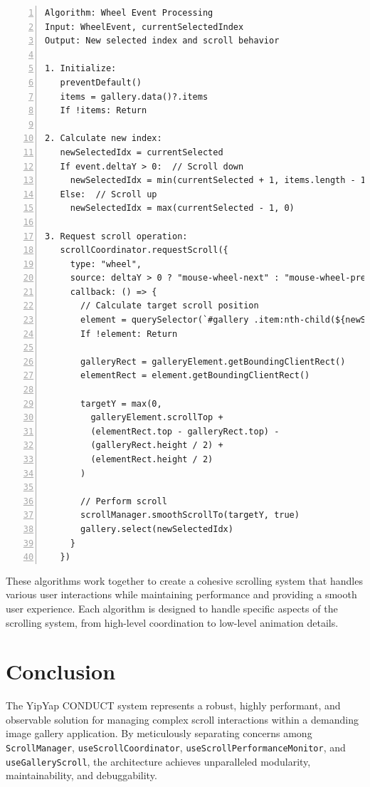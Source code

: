 \documentclass[10pt]{article}
\begin{document}
\begin{Verbatim}[frame=lines, numbers=left, tabsize=2, fontsize=\small, xleftmargin=1em, xrightmargin=1em, breaklines=true]
Algorithm: Wheel Event Processing
Input: WheelEvent, currentSelectedIndex
Output: New selected index and scroll behavior

1. Initialize:
   preventDefault()
   items = gallery.data()?.items
   If !items: Return

2. Calculate new index:
   newSelectedIdx = currentSelected
   If event.deltaY > 0:  // Scroll down
     newSelectedIdx = min(currentSelected + 1, items.length - 1)
   Else:  // Scroll up
     newSelectedIdx = max(currentSelected - 1, 0)

3. Request scroll operation:
   scrollCoordinator.requestScroll({
     type: "wheel",
     source: deltaY > 0 ? "mouse-wheel-next" : "mouse-wheel-prev",
     callback: () => {
       // Calculate target scroll position
       element = querySelector(`#gallery .item:nth-child(${newSelectedIdx + 1})`)
       If !element: Return
       
       galleryRect = galleryElement.getBoundingClientRect()
       elementRect = element.getBoundingClientRect()
       
       targetY = max(0,
         galleryElement.scrollTop +
         (elementRect.top - galleryRect.top) -
         (galleryRect.height / 2) +
         (elementRect.height / 2)
       )
       
       // Perform scroll
       scrollManager.smoothScrollTo(targetY, true)
       gallery.select(newSelectedIdx)
     }
   })
\end{Verbatim}

These algorithms work together to create a cohesive scrolling system that handles various user interactions while maintaining performance and providing a smooth user experience. Each algorithm is designed to handle specific aspects of the scrolling system, from high-level coordination to low-level animation details.

\section{Conclusion}

The YipYap CONDUCT system represents a robust, highly performant, and observable solution for managing complex scroll interactions within a demanding image gallery application. By meticulously separating concerns among \texttt{ScrollManager}, \texttt{useScrollCoordinator}, \texttt{useScrollPerformanceMonitor}, and \texttt{useGalleryScroll}, the architecture achieves unparalleled modularity, maintainability, and debuggability.
\end{document}
